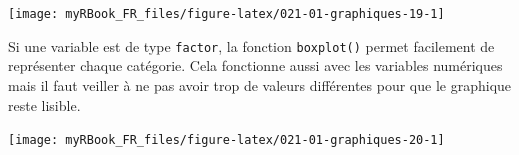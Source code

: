 \documentclass[twoside,symmetric]{book}
\newenvironment{Shaded}{}{}
\newcommand{\DataTypeTok}[1]{\underline{#1}}
\newcommand{\DecValTok}[1]{#1}
\newcommand{\KeywordTok}[1]{\textbf{#1}}
\newcommand{\NormalTok}[1]{#1}
\newcommand{\OperatorTok}[1]{#1}
\newcommand{\OtherTok}[1]{#1}
\newcommand{\StringTok}[1]{#1}
\begin{document}
\texttt{[image: myRBook\_FR\_files/figure-latex/021-01-graphiques-19-1]}

Si une variable est de type \texttt{factor}, la fonction \texttt{boxplot()} permet facilement de représenter chaque catégorie. Cela fonctionne aussi avec les variables numériques mais il faut veiller à ne pas avoir trop de valeurs différentes pour que le graphique reste lisible.

\begin{Shaded}
\end{Shaded}

\texttt{[image: myRBook\_FR\_files/figure-latex/021-01-graphiques-20-1]}
\end{document}

